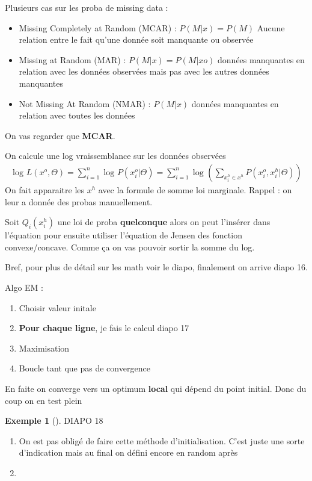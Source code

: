\documentclass{article}
\theoremstyle{plain}%
\theoremstyle{definition}
\newtheorem{exmp}{Exemple}[section]
\theoremstyle{remark}
\begin{document}
Plusieurs cas sur les proba de missing data : 
\begin{itemize}
    \item Missing Completely at Random (MCAR) : $P(M|x) = P(M)$ Aucune relation entre le fait qu'une donnée soit manquante ou observée
    \item Missing at Random (MAR) : $P(M|x) = P(M|xo)$ données manquantes en relation avec les données observées mais pas avec les autres données manquantes
    \item Not Missing At Random (NMAR) : $P(M|x)$ données   manquantes en relation avec toutes les données
\end{itemize}
On vas regarder que \textbf{MCAR}.

On calcule une log vraissemblance sur les données observées
\begin{align*}
    \log_{} L(x^o, \Theta ) = \sum_{i=1}^{n}\log_{} P(x_i^o | \Theta ) = \sum_{i=1}^{n}\log_{} (\sum_{x_i^h \in x^h}^{}P(x_i^o, x_i^h | \Theta ))
\end{align*}
On fait apparaitre les $ x^h $ avec la formule de somme loi marginale. Rappel : on leur a donnée des probas manuellement. 

Soit $ Q_i(x_i^h) $ une loi de proba \textbf{quelconque} alors on peut l'insérer dans l'équation pour ensuite utiliser l'équation de Jensen des fonction convexe/concave. Comme ça on vas pouvoir sortir la somme du log. 

Bref, pour plus de détail sur les math voir le diapo, finalement on arrive diapo 16. 

Algo EM : \begin{enumerate}
    \item Choisir valeur initale 
    \item \textbf{Pour chaque ligne}, je fais le calcul diapo 17 
    \item Maximisation 
    \item Boucle tant que pas de convergence
\end{enumerate}
En faite on converge vers un optimum \textbf{local} qui dépend du point initial. Donc du coup on en test plein 

\begin{exmp}[]
    DIAPO 18
    \begin{enumerate}
        \item On est pas obligé de faire cette méthode d'initialisation. C'est juste une sorte d'indication mais au final on défini encore en random après 
        \item 
    \end{enumerate}
\end{exmp}
\end{document}
